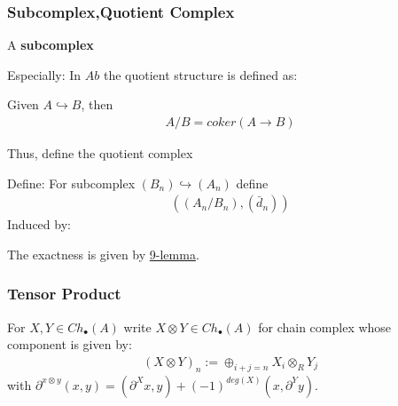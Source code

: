 \documentclass[Total.tex]{subfiles}
\begin{document}
				\subsubsection{Subcomplex,Quotient Complex}
					\begin{Def}
						A \textbf{subcomplex}
					\end{Def}
					Especially: In $Ab$ the quotient structure is defined as:
					\begin{Def}
						Given $A\hookrightarrow B$, then
						\begin{gather*}
							A/B=coker(A\rightarrow B)
						\end{gather*}
					\end{Def}
					Thus, define the quotient complex
					\begin{Def}
						Define: For subcomplex $(B_n)\hookrightarrow (A_n)$ define
						\begin{gather*}
							((A_n/B_n),(\bar{d}_n))
						\end{gather*}
						Induced by:
						\begin{center}
						\end{center}
					\end{Def}
					The exactness is given by \underline{9-lemma}.
				\subsubsection{Tensor Product}
				\begin{Def}
					For $X,Y\in Ch_\bullet(A)$ write $X\otimes Y\in Ch_\bullet(A)$ for chain complex whose component is given by:
					\begin{gather*}
						(X\otimes Y)_n:=\oplus_{i+j=n} X_i\otimes_R Y_j
					\end{gather*}
					with $\partial^{x\otimes y}(x,y)=(\partial^Xx,y)+(-1)^{deg(X)}(x,\partial^Yy)$.
				\end{Def}
				
\end{document}
